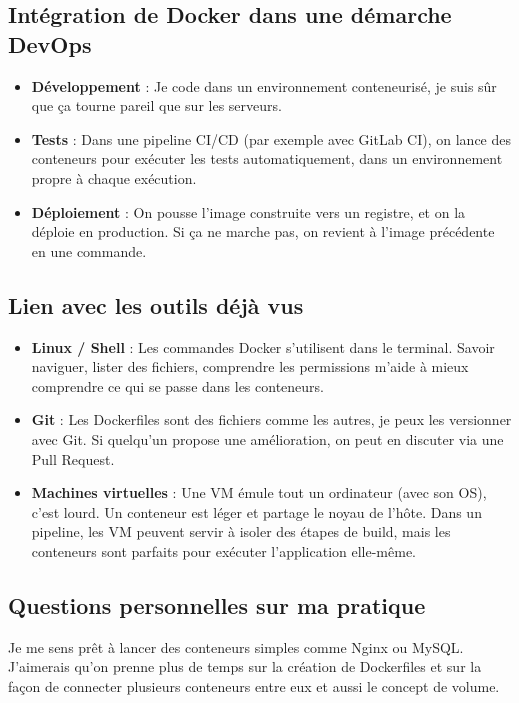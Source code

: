 \documentclass[12pt,a4paper]{article}
\begin{document}
\subsection{Intégration de Docker dans une démarche DevOps}

\begin{itemize}
    \item \textbf{Développement} : Je code dans un environnement conteneurisé, je suis sûr que ça tourne pareil que sur les serveurs.
    \item \textbf{Tests} : Dans une pipeline CI/CD (par exemple avec GitLab CI), on lance des conteneurs pour exécuter les tests automatiquement, dans un environnement propre à chaque exécution.
    \item \textbf{Déploiement} : On pousse l’image construite vers un registre, et on la déploie en production. Si ça ne marche pas, on revient à l’image précédente en une commande.
\end{itemize}

\subsection{Lien avec les outils déjà vus}

\begin{itemize}
    \item \textbf{Linux / Shell} : Les commandes Docker s’utilisent dans le terminal. Savoir naviguer, lister des fichiers, comprendre les permissions m’aide à mieux comprendre ce qui se passe dans les conteneurs.
    \item \textbf{Git} : Les Dockerfiles sont des fichiers comme les autres, je peux les versionner avec Git. Si quelqu’un propose une amélioration, on peut en discuter via une Pull Request.
    \item \textbf{Machines virtuelles} : Une VM émule tout un ordinateur (avec son OS), c’est lourd. Un conteneur est léger et partage le noyau de l’hôte. Dans un pipeline, les VM peuvent servir à isoler des étapes de build, mais les conteneurs sont parfaits pour exécuter l’application elle-même.
\end{itemize}

\subsection{Questions personnelles sur ma pratique}


Je me sens prêt à lancer des conteneurs simples comme Nginx ou MySQL. J’aimerais qu’on prenne plus de temps sur la création de Dockerfiles et sur la façon de connecter plusieurs conteneurs entre eux et aussi le concept de volume.
\end{document}
